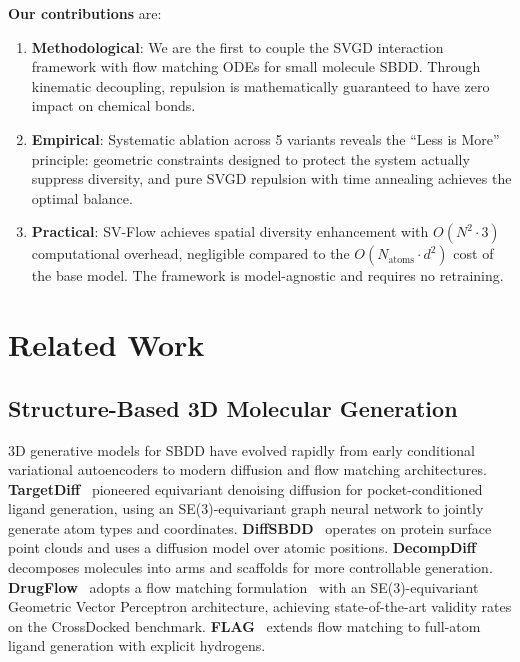 \documentclass[a4paper,11pt]{article}
\begin{document}
\textbf{Our contributions} are:

\begin{enumerate}
  \item \textbf{Methodological}: We are the first to couple the SVGD interaction
    framework with flow matching ODEs for small molecule SBDD.  Through
    kinematic decoupling, repulsion is mathematically guaranteed to have zero
    impact on chemical bonds.
  \item \textbf{Empirical}: Systematic ablation across 5 variants reveals the
    ``Less is More'' principle: geometric constraints designed to protect the
    system actually suppress diversity, and pure SVGD repulsion with time
    annealing achieves the optimal balance.
  \item \textbf{Practical}: SV-Flow achieves spatial diversity enhancement with
    $O(N^2 \cdot 3)$ computational overhead, negligible compared to the
    $O(N_{\text{atoms}} \cdot d^2)$ cost of the base model.  The framework is
    model-agnostic and requires no retraining.
\end{enumerate}

\section{Related Work}

\subsection{Structure-Based 3D Molecular Generation}

3D generative models for SBDD have evolved rapidly from early conditional
variational autoencoders to modern diffusion and flow matching architectures.
\textbf{TargetDiff}~\cite{guan2023targetdiff} pioneered equivariant denoising
diffusion for pocket-conditioned ligand generation, using an SE(3)-equivariant
graph neural network to jointly generate atom types and coordinates.
\textbf{DiffSBDD}~\cite{schneuing2024diffsbdd} operates on protein surface point
clouds and uses a diffusion model over atomic positions.
\textbf{DecompDiff}~\cite{guan2023decomp} decomposes molecules into arms and
scaffolds for more controllable generation.  \textbf{DrugFlow}~\cite{drugflow2024}
adopts a flow matching formulation~\cite{lipman2023flow} with an
SE(3)-equivariant Geometric Vector Perceptron architecture, achieving
state-of-the-art validity rates on the CrossDocked benchmark.
\textbf{FLAG}~\cite{zhang2024flag} extends flow matching to full-atom ligand
generation with explicit hydrogens.
\end{document}
